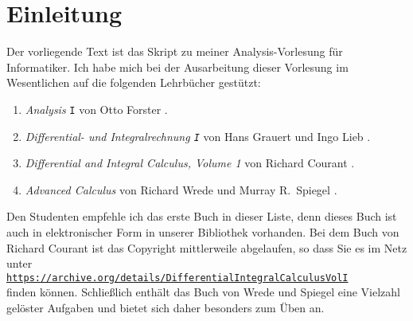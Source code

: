 \chapter{Einleitung}
Der vorliegende Text ist das Skript zu meiner Analysis-Vorlesung f\"ur Informatiker.  Ich habe mich
bei der Ausarbeitung dieser Vorlesung im Wesentlichen auf die folgenden Lehrb\"ucher gest\"utzt:
\begin{enumerate}
\item \emph{Analysis} \texttt{I} von Otto Forster \cite{forster:2011}.
\item \emph{Differential- und Integralrechnung \texttt{I}} von Hans Grauert und Ingo Lieb \cite{grauert:1967}.
\item \emph{Differential and Integral Calculus, Volume 1} von Richard Courant  \cite{courant:1937}.
\item \emph{Advanced Calculus} von Richard Wrede und Murray R.~Spiegel \cite{wrede:2010}.
\end{enumerate}
Den Studenten empfehle ich das erste Buch in dieser Liste, denn dieses Buch ist auch in
elektronischer Form in unserer Bibliothek vorhanden.  Bei dem Buch von Richard Courant ist das
Copyright mittlerweile abgelaufen, so dass Sie es im Netz unter
\\[0.2cm]
\hspace*{0.3cm}
\href{https://archive.org/details/DifferentialIntegralCalculusVolI}{\texttt{https://archive.org/details/DifferentialIntegralCalculusVolI}}
\\[0.2cm]
finden k\"onnen.  Schlie\ss{}lich enth\"alt das Buch von Wrede und Spiegel eine Vielzahl gel\"oster
Aufgaben und bietet sich daher besonders zum \"Uben an.

